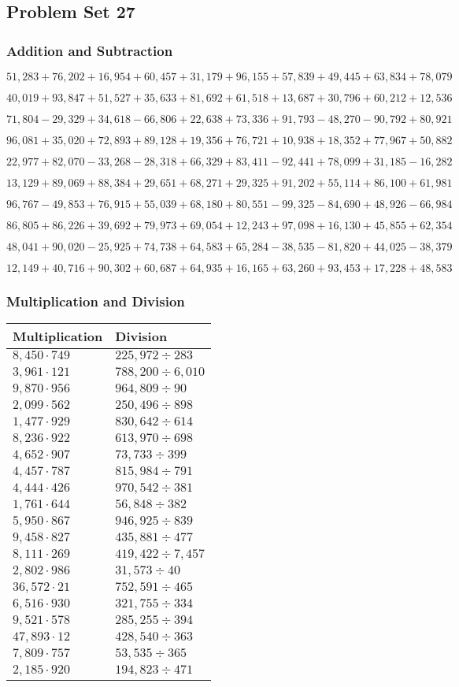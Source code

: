 \hypertarget{problem-set-27-4}{%
\subsection{Problem Set 27}\label{problem-set-27-4}}

\hypertarget{addition-and-subtraction-249}{%
\subsubsection{Addition and
Subtraction}\label{addition-and-subtraction-249}}

\(51,283+76,202+16,954+60,457+31,179+96,155+57,839+49,445+63,834+ 78,079\)

\(40,019+93,847+51,527+35,633+81,692+61,518+13,687+30,796+60,212+12,536\)

\(71,804-29,329+34,618-66,806+22,638+73,336+91,793-48,270-90,792+80,921\)

\(96,081+35,020+72,893+89,128+19,356+76,721+10,938+18,352+77,967+50,882\)

\(22,977+82,070-33,268-28,318+66,329+83,411-92,441+78,099+31,185-16,282\)

\(13,129+89,069+88,384+29,651+68,271+29,325+91,202+55,114+86,100+61,981\)

\(96,767-49,853+76,915+55,039+68,180+80,551-99,325-84,690+48,926-66,984\)

\(86,805+86,226+39,692+79,973+69,054+12,243+97,098+16,130+45,855+62,354\)

\(48,041+90,020-25,925+74,738+64,583+65,284-38,535-81,820+44,025-38,379\)

\(12,149+40,716+90,302+60,687+64,935+16,165+63,260+93,453+17,228+48,583\)

\hypertarget{multiplication-and-division-248}{%
\subsubsection{Multiplication and
Division}\label{multiplication-and-division-248}}

\begin{longtable}[]{@{}ll@{}}
\toprule
Multiplication & Division\tabularnewline
\midrule
\endhead
\(8,450\cdot749\) & \(225,972÷283\)\tabularnewline
\(3,961\cdot121\) & \(788,200÷6,010\)\tabularnewline
\(9,870\cdot956\) & \(964,809÷90\)\tabularnewline
\(2,099\cdot562\) & \(250,496÷898\)\tabularnewline
\(1,477\cdot929\) & \(830,642÷614\)\tabularnewline
\(8,236\cdot922\) & \(613,970÷698\)\tabularnewline
\(4,652\cdot907\) & \(73,733÷399\)\tabularnewline
\(4,457\cdot787\) & \(815,984÷791\)\tabularnewline
\(4,444\cdot426\) & \(970,542÷381\)\tabularnewline
\(1,761\cdot644\) & \(56,848÷382\)\tabularnewline
\(5,950\cdot867\) & \(946,925÷839\)\tabularnewline
\(9,458\cdot827\) & \(435,881÷477\)\tabularnewline
\(8,111\cdot269\) & \(419,422÷7,457\)\tabularnewline
\(2,802\cdot986\) & \(31,573÷40\)\tabularnewline
\(36,572\cdot21\) & \(752,591÷465\)\tabularnewline
\(6,516\cdot930\) & \(321,755÷334\)\tabularnewline
\(9,521\cdot578\) & \(285,255÷394\)\tabularnewline
\(47,893\cdot12\) & \(428,540÷363\)\tabularnewline
\(7,809\cdot757\) & \(53,535÷365\)\tabularnewline
\(2,185\cdot920\) & \(194,823÷471\)\tabularnewline
\bottomrule
\end{longtable}

